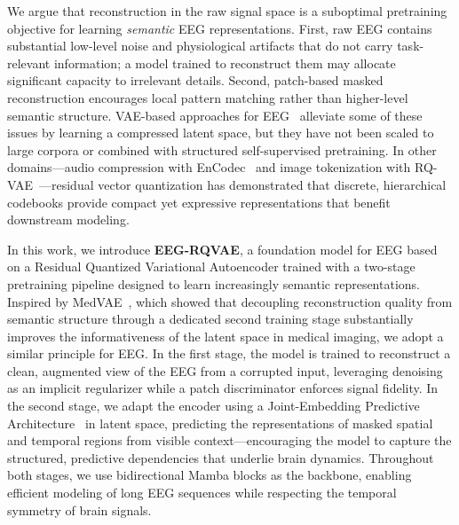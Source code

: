 \documentclass{article}
\begin{document}
We argue that reconstruction in the raw signal space is a suboptimal pretraining objective for learning \emph{semantic} EEG representations.
First, raw EEG contains substantial low-level noise and physiological artifacts that do not carry task-relevant information; a model trained to reconstruct them may allocate significant capacity to irrelevant details.
Second, patch-based masked reconstruction encourages local pattern matching rather than higher-level semantic structure.
VAE-based approaches for EEG~\citep{ZHAO2024120946, s25103178} alleviate some of these issues by learning a compressed latent space, but they have not been scaled to large corpora or combined with structured self-supervised pretraining.
In other domains---audio compression with EnCodec~\citep{défossez2022highfidelityneuralaudio} and image tokenization with RQ-VAE~\citep{9879532}---residual vector quantization has demonstrated that discrete, hierarchical codebooks provide compact yet expressive representations that benefit downstream modeling.

In this work, we introduce \textbf{EEG-RQVAE}, a foundation model for EEG based on a Residual Quantized Variational Autoencoder trained with a two-stage pretraining pipeline designed to learn increasingly semantic representations.
Inspired by MedVAE~\citep{varma2025medvaeefficientautomatedinterpretation}, which showed that decoupling reconstruction quality from semantic structure through a dedicated second training stage substantially improves the informativeness of the latent space in medical imaging, we adopt a similar principle for EEG.
In the first stage, the model is trained to reconstruct a clean, augmented view of the EEG from a corrupted input, leveraging denoising as an implicit regularizer while a patch discriminator enforces signal fidelity.
In the second stage, we adapt the encoder using a Joint-Embedding Predictive Architecture~\citep{assran2023selfsupervisedlearningimagesjointembedding} in latent space, predicting the representations of masked spatial and temporal regions from visible context---encouraging the model to capture the structured, predictive dependencies that underlie brain dynamics.
Throughout both stages, we use bidirectional Mamba blocks as the backbone, enabling efficient modeling of long EEG sequences while respecting the temporal symmetry of brain signals.
\end{document}
